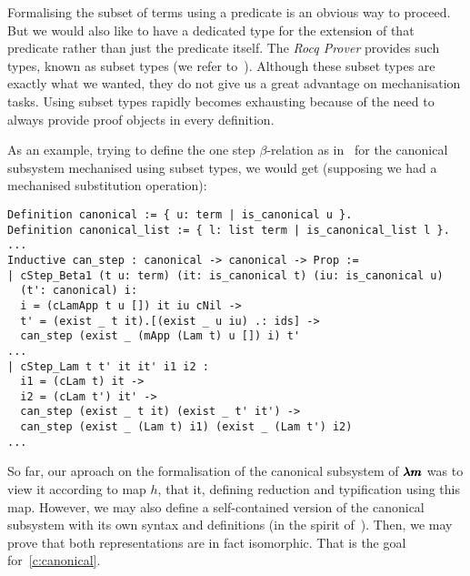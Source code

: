 Formalising the subset of terms using a predicate is an obvious way to proceed.
But we would also like to have a dedicated type for the extension of that predicate rather than just the predicate itself.
The \textit{Rocq Prover} provides such types, known as subset types (we refer to~\cite[Chapter~9.1]{CoqArt}).
Although these subset types are exactly what we wanted, they do not give us a great advantage on mechanisation tasks.
Using subset types rapidly becomes exhausting because of the need to always provide proof objects in every definition.

As an example, trying to define the one step $\beta$-relation as in~\cite[Chapter~3.1]{JCES2002} for the canonical subsystem mechanised using subset types, we would get (supposing we had a mechanised substitution operation):
\begin{lstlisting}[language=Coq]
Definition canonical := { u: term | is_canonical u }. 
Definition canonical_list := { l: list term | is_canonical_list l }.
...
Inductive can_step : canonical -> canonical -> Prop :=
| cStep_Beta1 (t u: term) (it: is_canonical t) (iu: is_canonical u)
  (t': canonical) i:
  i = (cLamApp t u []) it iu cNil ->
  t' = (exist _ t it).[(exist _ u iu) .: ids] ->
  can_step (exist _ (mApp (Lam t) u []) i) t'
...
| cStep_Lam t t' it it' i1 i2 :
  i1 = (cLam t) it ->
  i2 = (cLam t') it' ->
  can_step (exist _ t it) (exist _ t' it') ->
  can_step (exist _ (Lam t) i1) (exist _ (Lam t') i2)
...
\end{lstlisting}

So far, our aproach on the formalisation of the canonical subsystem of $\pmb{\lambda m}$ was to view it according to map $h$, that it, defining reduction and typification using this map.
However, we may also define a self-contained version of the canonical subsystem with its own syntax and definitions (in the spirit of~\cite[Chapter~3.1]{JCES2002}). %
Then, we may prove that both representations are in fact isomorphic.
That is the goal for~\cref{c:canonical}.

